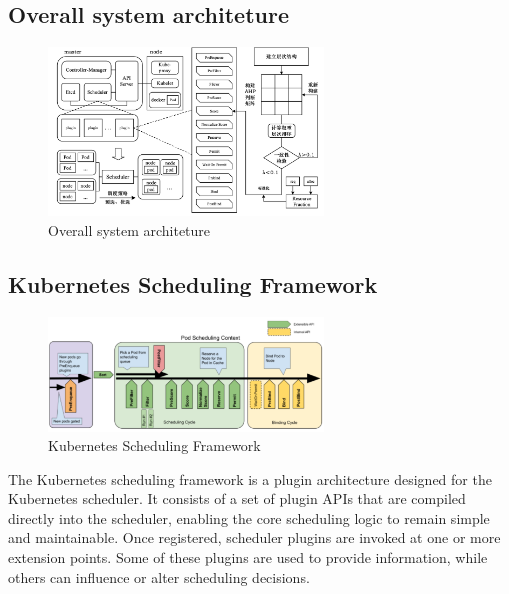 \documentclass{article}
\begin{document}
\subsection{Overall system architeture}

\newpage
\begin{figure}[htbp]
  \centering
  \includegraphics[width=0.65\textwidth]{pic01.png} %
  \caption{Overall system architeture}
  \label{1}
\end{figure}

\subsection{Kubernetes Scheduling Framework}
\begin{figure}[htbp]
  \centering
  \includegraphics[width=0.65\textwidth]{pic02.png} %
  \caption{Kubernetes Scheduling Framework}
  \label{2}
\end{figure}
The Kubernetes scheduling framework is a plugin architecture designed for the Kubernetes scheduler. It consists of a set of plugin APIs that are compiled directly into the scheduler, enabling the core scheduling logic to remain simple and maintainable. Once registered, scheduler plugins are invoked at one or more extension points. Some of these plugins are used to provide information, while others can influence or alter scheduling decisions.
\end{document}
